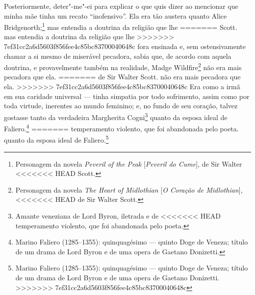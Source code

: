 {{{{{{{{{{{{{{{{{{{{{{{{{{{{{{{{{{{{{{{{{%
Posteriormente, deter"-me"-ei para explicar o que quis dizer ao
mencionar que minha mãe tinha um recato ``inofensivo''. Ela era tão
austera quanto Alice Bridgenorth;\footnote{Personagem da novela
  \textit{Peveril of the Peak} {[}\textit{Peveril do Cume}{]}, de Sir Walter
<<<<<<< HEAD
  Scott.} mas entendia a doutrina da religião que lhe
=======
  Scott.  mas entendia a doutrina da religião que lhe
>>>>>>> 7ef31cc2a6d5603f856fee4c85bc83700040648c
fora ensinada e, sem ostensivamente chamar a si mesmo de miserável
pecadora, sabia que, de acordo com aquela doutrina, e provavelmente
também na realidade, Madge Wildfire\footnote{Personagem da novela
  \textit{The Heart of Midlothian} {[}\textit{O Coração de Midlothian}{]},
<<<<<<< HEAD
  de Sir Walter Scott.} não era mais pecadora que ela.
=======
  de Sir Walter Scott.  não era mais pecadora que ela.
>>>>>>> 7ef31cc2a6d5603f856fee4c85bc83700040648c
Era como a irmã em sua caridade universal --- tinha simpatia por todo
sofrimento, assim como por toda virtude, inerentes ao mundo feminino; e,
no fundo de seu coração, talvez gostasse tanto da verdadeira Margherita
Cogni\footnote{Amante veneziana de Lord Byron, iletrada e de
<<<<<<< HEAD
  temperamento violento, que foi abandonada pelo poeta.}
quanto da esposa ideal de Faliero.\footnote{Marino Faliero (1285--1355):
  quinquagésimo --- quinto Doge de Veneza; título de um drama de Lord
  Byron e de uma opera de Gaetano Donizetti.}
=======
  temperamento violento, que foi abandonada pelo poeta. 
quanto da esposa ideal de Faliero.\footnote{Marino Faliero (1285--1355):
  quinquagésimo --- quinto Doge de Veneza; título de um drama de Lord
  Byron e de uma opera de Gaetano Donizetti. 
>>>>>>> 7ef31cc2a6d5603f856fee4c85bc83700040648c

}}}}}}}}}}}}}}}}}}}}}}}}}}}}}}}}}}}}}}}}}}
